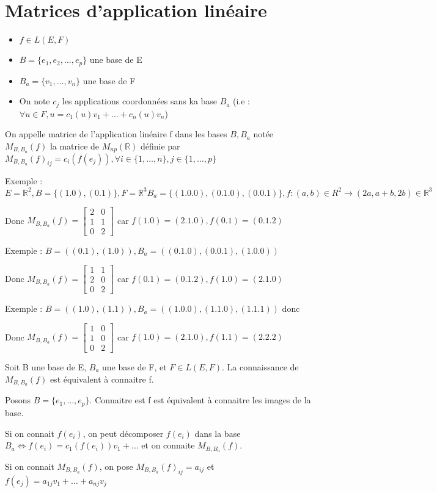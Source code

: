 \documentclass[french]{yLectureNote}
\newcommand{\R}[0]{\mathbb{R}}
\begin{document}
\section{Matrices d'application linéaire}
\begin{definition}
\begin{itemize}
 \item \(f\in L(E,F)\)
 \item \(B = \{e_1,e_2,\dots,e_p\}\) une base de E
 \item \(B_a = \{v_1,\dots, v_n\}\) une base de F
 \item On note \(c_j\) les applications coordonnées sans ka base \(B_a\) (i.e : \(\forall u\in F, u = c_1(u)v_1+\dots+c_n(u)v_n\))

\end{itemize}
On appelle matrice de l'application linéaire f dans les bases \(B, B_a\) notée \(M_{B,B_a}(f)\) la matrice de \(M_{np}(\R)\) définie par \(M_{B,B_a}(f)_{ij} = c_i(f(e_j)), \forall i \in \{1,\dots, n\}, j\in \{1,\dots, p\}\)
\end{definition}
Exemple : \(E=\R^2, B=\{(1.0),(0.1)\}, F = \R^3 B_a = \{(1.0.0),(0.1.0),(0.0.1)\}, f:(a,b)\in R^2 \to (2a, a+b, 2b)\in \R^3\)

Donc \(M_{B,B_a}(f) = \begin{bmatrix}2&0\\1&1\\0&2\end{bmatrix}\) car \(f(1.0) = (2.1.0),f(0.1) = (0.1.2)\)

Exemple : \(B = ((0.1),(1.0)), B_a = ((0.1.0), (0.0.1), (1.0.0))\)

Donc \(M_{B,B_a}(f) = \begin{bmatrix}1&1\\2&0\\0&2\end{bmatrix}\) car \(f(0.1) = (0.1.2),f(1.0) = (2.1.0)\)

Exemple : \(B = ((1.0), (1.1)), B_a = ((1.0.0),(1.1.0), (1.1.1)) \) donc

Donc \(M_{B,B_a}(f) = \begin{bmatrix}1&0\\1&0\\0&2\end{bmatrix}\) car \(f(1.0) = (2.1.0),f(1.1) = (2.2.2)\)

\begin{proposition}
Soit B une base de E, \(B_a\) une base de F, et \(F\in L(E,F)\). La connaissance de \(M_{B,B_a}(f)\) est équivalent à connaitre f.
\end{proposition}
\begin{myproof}
 Posons \(B = \{e_1,\dots, e_p\}\). Connaitre est f est équivalent à connaitre les images de la base.

Si on connait \(f(e_i)\), on peut décomposer \(f(e_i)\) dans la base \(B_a \iff f(e_i) = c_1(f(e_i))v_1+\dots\) et on connaite \(M_{B,B_a}(f)\).

Si on connait \(M_{B,B_a}(f)\), on pose \(M_{B,B_a}(f)_{ij} = a_{ij}\) et \(f(e_j) = a_{1j}v_1+\dots+a_{nj}v_j\)
\end{myproof}
\end{document}
